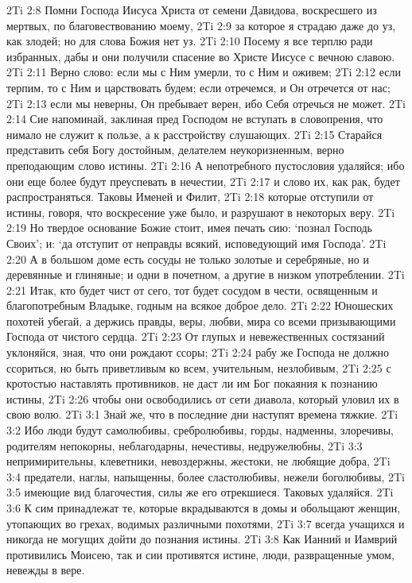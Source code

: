 2Ti 2:8  Помни Господа Иисуса Христа от семени Давидова, воскресшего из мертвых, по благовествованию моему,
2Ti 2:9  за которое я страдаю даже до уз, как злодей; но для слова Божия нет уз.
2Ti 2:10  Посему я все терплю ради избранных, дабы и они получили спасение во Христе Иисусе с вечною славою.
2Ti 2:11  Верно слово: если мы с Ним умерли, то с Ним и оживем;
2Ti 2:12  если терпим, то с Ним и царствовать будем; если отречемся, и Он отречется от нас;
2Ti 2:13  если мы неверны, Он пребывает верен, ибо Себя отречься не может.
2Ti 2:14  Сие напоминай, заклиная пред Господом не вступать в словопрения, что нимало не служит к пользе, а к расстройству слушающих.
2Ti 2:15  Старайся представить себя Богу достойным, делателем неукоризненным, верно преподающим слово истины.
2Ti 2:16  А непотребного пустословия удаляйся; ибо они еще более будут преуспевать в нечестии,
2Ti 2:17  и слово их, как рак, будет распространяться. Таковы Именей и Филит,
2Ti 2:18  которые отступили от истины, говоря, что воскресение уже было, и разрушают в некоторых веру.
2Ti 2:19  Но твердое основание Божие стоит, имея печать сию: `познал Господь Своих'; и: `да отступит от неправды всякий, исповедующий имя Господа'.
2Ti 2:20  А в большом доме есть сосуды не только золотые и серебряные, но и деревянные и глиняные; и одни в почетном, а другие в низком употреблении.
2Ti 2:21  Итак, кто будет чист от сего, тот будет сосудом в чести, освященным и благопотребным Владыке, годным на всякое доброе дело.
2Ti 2:22  Юношеских похотей убегай, а держись правды, веры, любви, мира со всеми призывающими Господа от чистого сердца.
2Ti 2:23  От глупых и невежественных состязаний уклоняйся, зная, что они рождают ссоры;
2Ti 2:24  рабу же Господа не должно ссориться, но быть приветливым ко всем, учительным, незлобивым,
2Ti 2:25  с кротостью наставлять противников, не даст ли им Бог покаяния к познанию истины,
2Ti 2:26  чтобы они освободились от сети диавола, который уловил их в свою волю.
2Ti 3:1  Знай же, что в последние дни наступят времена тяжкие.
2Ti 3:2  Ибо люди будут самолюбивы, сребролюбивы, горды, надменны, злоречивы, родителям непокорны, неблагодарны, нечестивы, недружелюбны,
2Ti 3:3  непримирительны, клеветники, невоздержны, жестоки, не любящие добра,
2Ti 3:4  предатели, наглы, напыщенны, более сластолюбивы, нежели боголюбивы,
2Ti 3:5  имеющие вид благочестия, силы же его отрекшиеся. Таковых удаляйся.
2Ti 3:6  К сим принадлежат те, которые вкрадываются в домы и обольщают женщин, утопающих во грехах, водимых различными похотями,
2Ti 3:7  всегда учащихся и никогда не могущих дойти до познания истины.
2Ti 3:8  Как Ианний и Иамврий противились Моисею, так и сии противятся истине, люди, развращенные умом, невежды в вере.
